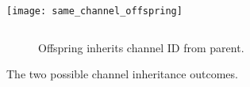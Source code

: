 \begin{figure}
\begin{columns}
  \begin{column}{0.5\textwidth}
    \colorbox{extralightgray}{\texttt{[image: same\_channel\_offspring]}}
  \end{column}%
  \begin{column}{0.5\textwidth}
  \end{column}%
\end{columns}%
\begin{columns}
  \begin{column}{0.5\textwidth}
    \begin{subfigure}[b]{\textwidth}
    \caption{Offspring inherits channel ID from parent.}
    \end{subfigure}
  \end{column}%
  \begin{column}{0.5\textwidth}
  \end{column}%
\end{columns}%
\caption{The two possible channel inheritance outcomes.}
\end{figure}
